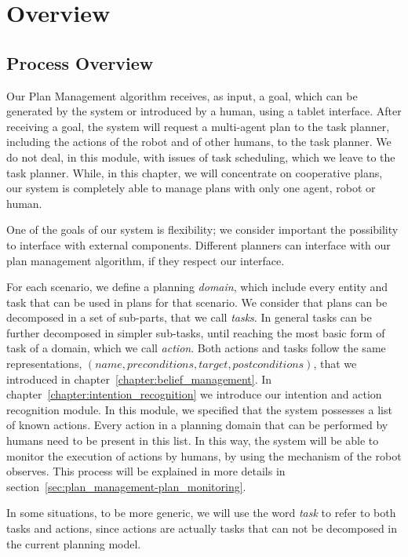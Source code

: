 \section{Overview}
\label{sec:plan_management-overview}

\subsection{Process Overview}
Our Plan Management algorithm receives, as input, a goal, which can be generated by the system or introduced by a human, using a tablet interface. After receiving a goal, the system will request a multi-agent plan to the task planner, including the actions of the robot and of other humans, to the task planner. We do not deal, in this module, with issues of task scheduling, which we leave to the task planner. While, in this chapter, we will concentrate on cooperative plans, our system is completely able to manage plans with only one agent, robot or human. 

One of the goals of our system is flexibility; we consider important the possibility to interface with external components. Different planners can interface with our plan management algorithm, if they respect our interface.

For each scenario, we define a planning \textit{domain}, which include every entity and task that can be used in plans for that scenario. We consider that plans can be decomposed in a set of sub-parts, that we call \textit{tasks}. In general tasks can be further decomposed in simpler sub-tasks, until reaching the most basic form of task of a domain, which we call \textit{action}. Both actions and tasks follow the same representations, $(name,preconditions,target,postconditions)$, that we introduced in chapter~\ref{chapter:belief_management}. In chapter~\ref{chapter:intention_recognition} we introduce our intention and action recognition module. In this module, we specified that the system possesses a list of known actions. Every action in a planning domain that can be performed by humans need to be present in this list. In this way, the system will be able to monitor the execution of actions by humans, by using the mechanism of the robot observes. This process will be explained in more details in section~\ref{sec:plan_management-plan_monitoring}.

In some situations, to be more generic, we will use the word \textit{task} to refer to both tasks and actions, since actions are actually tasks that can not be decomposed in the current planning model.

